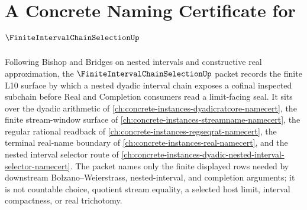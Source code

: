 \chapter{A Concrete Naming Certificate for $\FiniteIntervalChainSelectionUp$}
\label{ch:concrete-instances-finite-interval-chain-selection-namecert}

Following Bishop and Bridges on nested intervals and constructive real approximation, the $\FiniteIntervalChainSelectionUp$ packet records the finite L10 surface by which a nested dyadic interval chain exposes a cofinal inspected subchain before Real and Completion consumers read a limit-facing seal. It sits over the dyadic arithmetic of \autoref{ch:concrete-instances-dyadicratcore-namecert}, the finite stream-window surface of \autoref{ch:concrete-instances-streamname-namecert}, the regular rational readback of \autoref{ch:concrete-instances-regseqrat-namecert}, the terminal real-name boundary of \autoref{ch:concrete-instances-real-namecert}, and the nested interval selector route of \autoref{ch:concrete-instances-dyadic-nested-interval-selector-namecert}. The packet names only the finite displayed rows needed by downstream Bolzano--Weierstrass, nested-interval, and completion arguments; it is not countable choice, quotient stream equality, a selected host limit, interval compactness, or real trichotomy.

